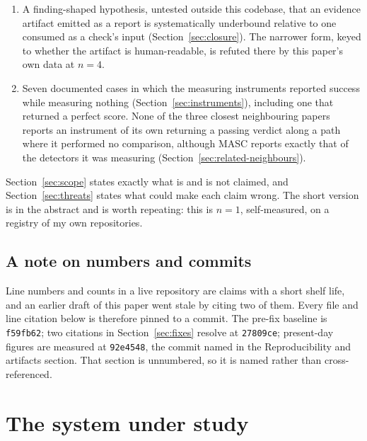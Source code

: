 \documentclass[11pt]{article}
\begin{document}
\begin{enumerate}
on its own, against a structural ceiling of $16/112$ that no amount of care in writing those
sixteen fixtures could beat (Section~\ref{sec:rq1}). MASC reports the same shape of result
from the other side of the pipeline, and Section~\ref{sec:related-unclaimed} sets out how
the two partitions differ.
\item A finding-shaped hypothesis, untested outside this codebase, that an evidence artifact
emitted as a report is systematically underbound relative to one consumed as a check's input
(Section~\ref{sec:closure}). The narrower form, keyed to whether the artifact is human-readable,
is refuted there by this paper's own data at $n=4$.
\item Seven documented cases in which the measuring instruments reported success while
measuring nothing (Section~\ref{sec:instruments}), including one that returned a perfect
score. None of the three closest neighbouring papers reports an instrument of its own
returning a passing verdict along a path where it performed no comparison, although MASC
reports exactly that of the detectors it was measuring
(Section~\ref{sec:related-neighbours}).
\end{enumerate}

Section~\ref{sec:scope} states exactly what is and is not claimed, and
Section~\ref{sec:threats} states what could make each claim wrong. The short version is in
the abstract and is worth repeating: this is $n=1$, self-measured, on a registry of my own
repositories.

\subsection*{A note on numbers and commits}

Line numbers and counts in a live repository are claims with a short shelf life, and an
earlier draft of this paper went stale by citing two of them. Every file and line citation
below is therefore pinned to a commit. The pre-fix baseline is \texttt{f59fb62}; two
citations in Section~\ref{sec:fixes} resolve at \texttt{27809ce}; present-day figures are
measured at \texttt{92e4548}, the commit named in the Reproducibility and artifacts
section. That section is unnumbered, so it is named rather than cross-referenced.

\section{The system under study}
\label{sec:system}
\end{document}
